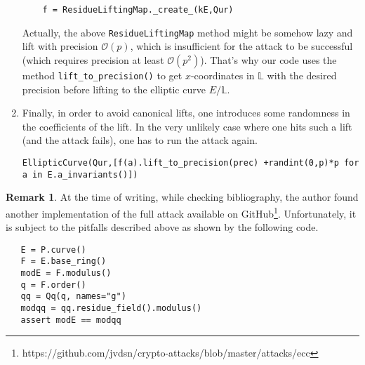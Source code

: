 \documentclass[10pt]{article}
\theoremstyle{definition}
\newtheorem{remark}{Remark}
\renewcommand{\L}{\mathbb{L}}
\begin{document}
\begin{enumerate}
\begin{verbatim}
    f = ResidueLiftingMap._create_(kE,Qur)
\end{verbatim}

Actually, the above \verb|ResidueLiftingMap| method might be somehow lazy and lift with precision $\mathcal{O}(p)$, which is insufficient for the attack to be successful (which requires precision at least $\mathcal{O}(p^2)$).
That's why our code uses the method \verb|lift_to_precision()| to get $x$-coordinates in $\L$ with the desired precision before lifting to the elliptic curve $E/\L$.

\item Finally, in order to avoid canonical lifts, one introduces some randomness in the coefficients of the lift.
In the very unlikely case where one hits such a lift (and the attack fails), one has to run the attack again.

\begin{verbatim}
EllipticCurve(Qur,[f(a).lift_to_precision(prec) +randint(0,p)*p for a in E.a_invariants()])
\end{verbatim}
\end{enumerate}
\begin{remark}
At the time of writing, while checking bibliography, the author found another implementation of the full attack available on GitHub\footnote{https://github.com/jvdsn/crypto-attacks/blob/master/attacks/ecc}.
Unfortunately, it is subject to the pitfalls described above as shown by the following code.
\begin{verbatim}
   E = P.curve()
   F = E.base_ring()
   modE = F.modulus()
   q = F.order()
   qq = Qq(q, names="g")
   modqq = qq.residue_field().modulus()
   assert modE == modqq
\end{verbatim}

\end{remark}




\end{document}
